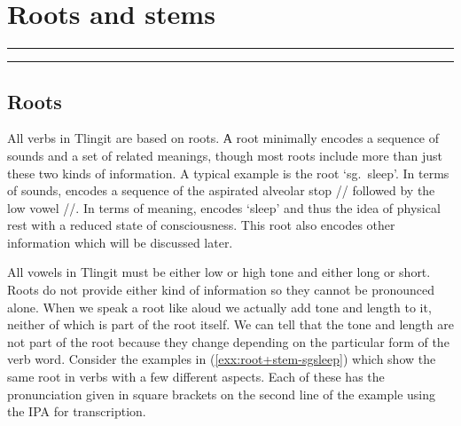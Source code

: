 
\resetexcnt
\chapter{Roots and stems}\label{ch:root+stem}

\startcontents[chapters]
\noindent\rule[0.5em]{\textwidth}{\heavyrulewidth}
\noindent\rule{\textwidth}{\heavyrulewidth}
\vspace{1\baselineskip}


\section{Roots}\label{sec:root+stem-roots}

All verbs in Tlingit are based on roots. А root minimally encodes a sequence of sounds and a set of related meanings, though most roots include more than just these two kinds of information. A typical example is the root  ‘sg.\ sleep’. In terms of sounds,  encodes a sequence of the aspirated alveolar stop  // followed by the low vowel  //. In terms of meaning,  encodes ‘sleep’ and thus the idea of physical rest with a reduced state of consciousness. This root also encodes other information which will be discussed later.

All vowels in Tlingit must be either low or high tone and either long or short. Roots do not provide either kind of information so they cannot be pronounced alone. When we speak a root like  aloud we actually add tone and length to it, neither of which is part of the root itself. We can tell that the tone and length are not part of the root because they change depending on the particular form of the verb word. Consider the examples in (\ref{exx:root+stem-sgsleep}) which show the same root in verbs with a few different aspects. Each of these has the pronunciation given in square brackets on the second line of the example using the IPA for transcription.

